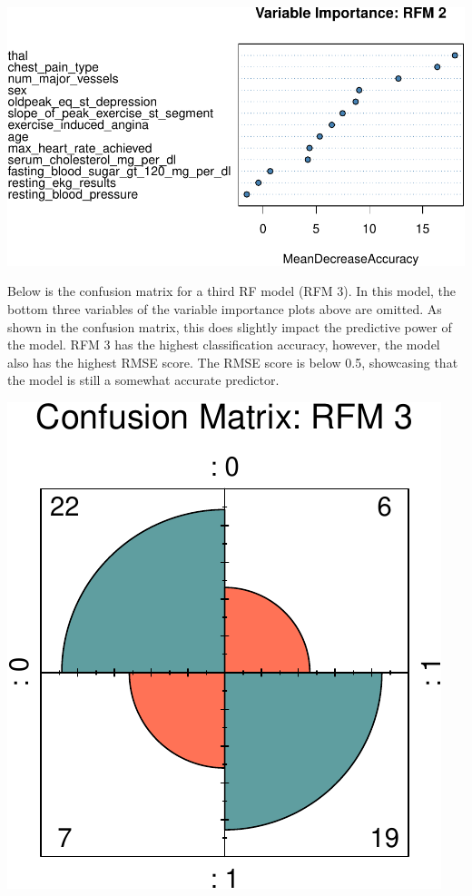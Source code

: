 \documentclass[11pt,preprint, authoryear]{elsarticle}
\numberwithin{equation}{section}
\numberwithin{figure}{section}
\numberwithin{table}{section}
\begin{document}
\begin{center}\includegraphics{ML_project_files/figure-latex/unnamed-chunk-14-1} \end{center}

Below is the confusion matrix for a third RF model (RFM 3). In this
model, the bottom three variables of the variable importance plots above
are omitted. As shown in the confusion matrix, this does slightly impact
the predictive power of the model. RFM 3 has the highest classification
accuracy, however, the model also has the highest RMSE score. The RMSE
score is below 0.5, showcasing that the model is still a somewhat
accurate predictor.

\begin{center}\includegraphics{ML_project_files/figure-latex/unnamed-chunk-16-1} \end{center}
\end{document}
